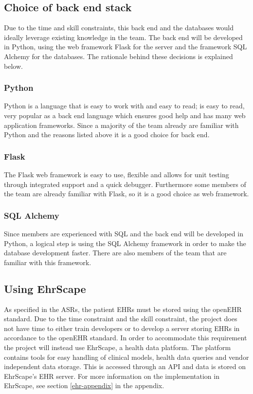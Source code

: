 \documentclass{article}
\begin{document}
\subsection{Choice of back end stack}
Due to the time and skill constraints, this back end and the databases would ideally leverage existing knowledge in the team. The back end will be developed in Python, using the web framework Flask for the server and the framework SQL Alchemy for the databases. The rationale behind these decisions is explained below.

\subsubsection{Python}
Python is a language that is easy to work with and easy to read; is easy to read, very popular as a back end language which ensures good help and has many web application frameworks. Since a majority of the team already are familiar with Python and the reasons listed above it is a good choice for back end. 
\subsubsection{Flask}
The Flask web framework is easy to use, flexible and allows for unit testing through integrated support and a quick debugger. Furthermore some members of the team are already familiar with Flask, so it is a good choice as web framework.
\subsubsection{SQL Alchemy}
Since members are experienced with SQL and the back end will be developed in Python, a logical step is using the SQL Alchemy framework in order to make the database development faster. There are also members of the team that are familiar with this framework.

\subsection{Using EhrScape}
As specified in the ASRs, the patient EHRs must be stored using the openEHR standard. Due to the time constraint and the skill constraint, the project does not have time to either train developers or to develop a server storing EHRs in accordance to the openEHR standard. In order to accommodate this requirement the project will instead use EhrScape, a health data platform. The platform contains tools for easy handling of clinical models, health data queries and vendor independent data storage. This is accessed through an API and data is stored on EhrScape's EHR server. For more information on the implementation in EhrScape, see section \ref{ehr-appendix} in the appendix.
\end{document}
